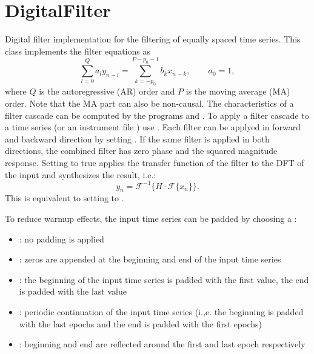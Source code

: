 \section{DigitalFilter}\label{digitalFilterType}
Digital filter implementation for the filtering of equally spaced time series. This class implements the filter equations as
\begin{equation}\label{digitalFilterType:arma}
  \sum_{l=0}^Q a_l y_{n-l} = \sum_{k=-p_0}^{P-p_0-1} b_k x_{n-k}, \hspace{25pt} a_0 = 1,
\end{equation}
where $Q$ is the autoregressive (AR) order and $P$ is the moving average (MA) order. Note that the MA part can also be non-causal.
The characteristics of a filter cascade can be computed by the programs  and .
To apply a filter cascade to a time series (or an instrument file ) use .
Each filter can be applyed in forward and backward direction by setting .
If the same filter is applied in both directions, the combined filter has zero phase and the squared magnitude response.
Setting  to true applies the transfer function of the filter to the DFT of the input and synthesizes the result, i.e.:
\begin{equation}
  y_n = \mathcal{F}^{-1}\{H\cdot\mathcal{F}\{x_n\}\}.
\end{equation}
This is equivalent to setting  to .

To reduce warmup effects, the input time series can be padded by choosing a :
\begin{itemize}
\item {}: no padding is applied
\item {}: zeros are appended at the beginning and end of the input time series
\item {}: the beginning of the input time series is padded with the first value, the end is padded with the last value
\item {}: periodic continuation of the input time series (i.,e. the beginning is padded with the last epochs and the end is padded with the first epochs)
\item {}: beginning and end are reflected around the first and last epoch respectively
\end{itemize}


